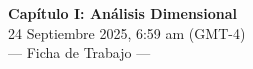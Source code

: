  \begin{multicols}{2}
   \begin{center}
         \LARGE{\textbf{Capítulo I: Análisis Dimensional}}\\	
         \vspace{0.2cm}
         \large{24 Septiembre 2025, 6:59 am (GMT-4)}\\
         \large{— Ficha de Trabajo —}
     \end{center}


\end{multicols}
